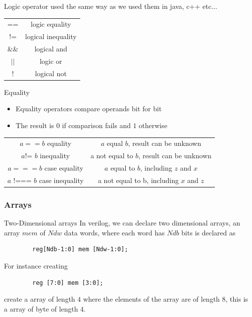 \begin{parag}{Logic operator}
    used the same way as we used them in java, c++ etc...
    \begin{center} \begin{tabular}{c|c}== & logic equality \\ != & logical inequality \\ \&\& & logical and \\ $\left|\right|$ & logic or \\ ! & logical not \end{tabular} \end{center} 
\end{parag}

\begin{parag}{Equality}
    \begin{itemize}
        \item Equality operators compare operands bit for bit
        \item The result is $0$ if comparison fails and $1$ otherwise
    \end{itemize}
    \begin{center} \begin{tabular}{cc}$a = = b$ equality & $a$ equal $b$, result can be unknown \\ $a $!=  $b$ inequality & a not equal to $b$, result can be unknown \\$a = = = b$ case equality  & $a$ equal to $b$, including $z$ and $x$ \\ $a$ !=== $b$ case inequality & a not equal to b, including $x$ and $z$ \end{tabular} \end{center} 
    
    
\end{parag}




\subsubsection{Arrays}
\begin{parag}{Two-Dimensional arrays}
    In verilog, we can declare two dimensional arrays, an array $mem$ of $Ndw$ data words, where each word has $Ndb$ bits is declared as
    \begin{lstlisting}
        reg[Ndb-1:0] mem [Ndw-1:0];
    \end{lstlisting}
    
    For instance creating
    \begin{lstlisting}
        reg [7:0] mem [3:0];
    \end{lstlisting}
   create a array of length $4$ where the elements of the array are of length $8$, this is a array of byte of length $4$.
    
    
\end{parag}




